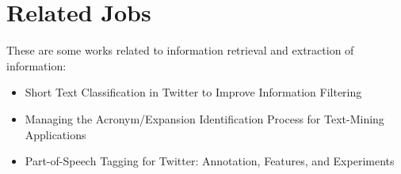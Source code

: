\documentclass[12pt]{article}
\begin{document}
\section{Related Jobs}
These are some works related to information retrieval and extraction of information:
\begin{itemize}
\item Short Text Classification in Twitter to Improve Information Filtering \cite{Sriram:10}
\item Managing the Acronym/Expansion Identification Process for Text-Mining Applications \cite{Roche:08} 
\item Part-of-Speech Tagging for Twitter: Annotation, Features, and Experiments \cite{Gimpel:11}
\end{itemize}



\end{document}
